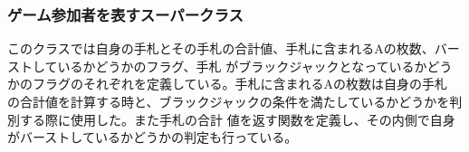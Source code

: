 \subsubsection{ゲーム参加者を表すスーパークラス}
このクラスでは自身の手札とその手札の合計値、手札に含まれるAの枚数、バーストしているかどうかのフラグ、手札
がブラックジャックとなっているかどうかのフラグのそれぞれを定義している。手札に含まれるAの枚数は自身の手札
の合計値を計算する時と、ブラックジャックの条件を満たしているかどうかを判別する際に使用した。また手札の合計
値を返す関数を定義し、その内側で自身がバーストしているかどうかの判定も行っている。%

